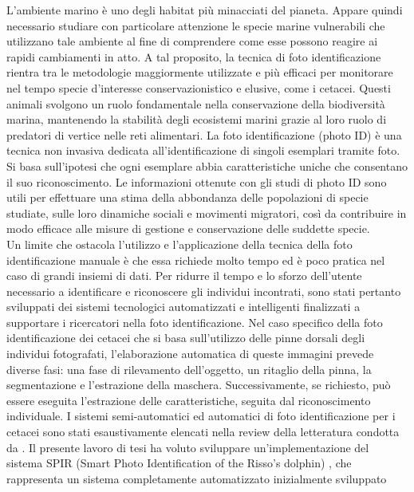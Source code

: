 \documentclass[a4paper,12pt]{report}
\begin{document}
  L'ambiente marino è uno degli habitat più minacciati del pianeta.
  \newpage
  Appare quindi necessario 
  studiare con particolare attenzione le specie marine
  vulnerabili che utilizzano tale ambiente al fine di comprendere come esse possono reagire ai rapidi cambiamenti in atto. 
  A tal proposito, la tecnica di foto identificazione rientra tra le metodologie maggiormente
  utilizzate e più efficaci per monitorare nel tempo specie d'interesse conservazionistico e elusive, 
  come i cetacei. Questi animali svolgono un ruolo fondamentale nella conservazione della biodiversità marina, mantenendo la stabilità 
  degli ecosistemi marini grazie al loro ruolo di predatori di vertice nelle reti alimentari.
  La foto identificazione (photo ID) è una tecnica non invasiva dedicata all'identificazione 
  di singoli esemplari tramite foto. Si basa sull'ipotesi che ogni esemplare abbia caratteristiche uniche che consentano il suo riconoscimento.
  Le informazioni ottenute con gli studi di photo ID sono utili per effettuare una stima della abbondanza delle popolazioni di specie studiate,
  sulle loro dinamiche sociali e movimenti migratori, così da contribuire in modo efficace alle misure di gestione e conservazione delle suddette specie.
  \\
  Un limite che ostacola l'utilizzo e l'applicazione della tecnica della foto identificazione manuale è che essa
  richiede molto tempo ed è poco pratica nel caso di grandi insiemi di dati. Per ridurre il tempo e lo sforzo dell'utente necessario a
  identificare e riconoscere gli individui incontrati, sono stati pertanto sviluppati dei sistemi tecnologici automatizzati e intelligenti
  finalizzati a supportare i ricercatori nella foto identificazione. Nel caso specifico della foto identificazione dei cetacei che si basa sull'utilizzo
  delle pinne dorsali degli individui fotografati, l'elaborazione automatica di queste immagini prevede diverse fasi: una fase di rilevamento dell'oggetto, un ritaglio della pinna, la segmentazione e l'estrazione della maschera. Successivamente, 
  se richiesto, può essere eseguita l'estrazione delle caratteristiche, seguita dal riconoscimento individuale. I sistemi semi-automatici ed automatici di foto identificazione
  per i cetacei sono stati esaustivamente elencati nella review della letteratura condotta da \cite{maglietta2022machine}. 
  Il presente lavoro di tesi ha voluto sviluppare un'implementazione del sistema SPIR (Smart Photo Identification of the Risso’s dolphin) \cite{maglietta2018dolfin}, 
  che rappresenta un sistema completamente automatizzato inizialmente sviluppato
\end{document}

